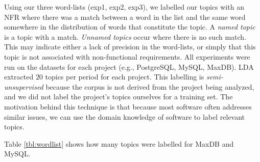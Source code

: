 \documentclass[smallextended]{svjour3}       %
\begin{document}
Using our three word-lists (\textsf{exp1}, \textsf{exp2}, \textsf{exp3}), we labelled our topics with an NFR where there was a match between a word in
the list and the same word somewhere in the distribution of words that constitute the topic.
A \emph{named topic} is a topic with a match. 
\emph{Unnamed topics} occur where there is no such match. 
This may indicate either a lack of precision in the word-lists, or simply that this topic is not associated with non-functional
requirements.
All experiments were run on the datasets for each project (e.g., PostgreSQL, MySQL, MaxDB). LDA
extracted $20$ topics per period for each project.
This labelling is \emph{semi-unsupervised} because the corpus is not derived from 
the project being analyzed, and we did not label the project's topics
ourselves for a training set. The motivation behind this technique is that
because most software often addresses similar issues, we can use the 
domain knowledge of software to label relevant topics.


Table \ref{tbl:wordlist} shows how many topics were labelled for MaxDB
and MySQL.
\end{document}
